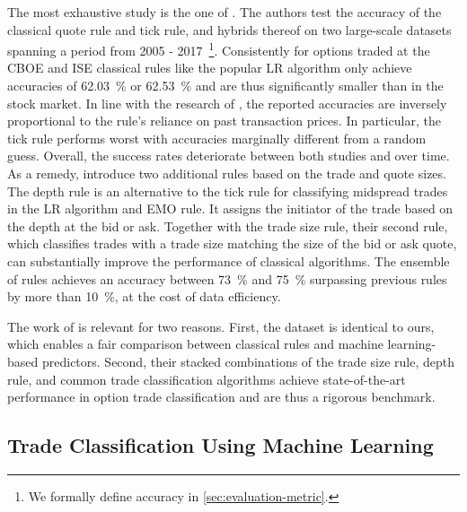 The most exhaustive study is the one of \textcite[1--39]{grauerOptionTradeClassification2022}. The authors test the accuracy of the classical quote rule and tick rule, and hybrids thereof on two large-scale datasets spanning a period from 2005 - 2017~\footnote{We formally define accuracy in \cref{sec:evaluation-metric}.}. Consistently for options traded at the \gls{CBOE} and \gls{ISE} classical rules like the popular \gls{LR}  algorithm only achieve accuracies of \SI{62.03}{\percent} or \SI{62.53}{\percent} and are thus significantly smaller than in the stock market. In line with the research of \textcite[886]{savickasInferringDirectionOption2003}, the reported accuracies are inversely proportional to the rule's reliance on past transaction prices. In particular, the tick rule performs worst with accuracies marginally different from a random guess. Overall, the success rates deteriorate between both studies and over time. As a remedy, \textcite[14--17]{grauerOptionTradeClassification2022} introduce two additional rules based on the trade and quote sizes. The depth rule is an alternative to the tick rule for classifying midspread trades in the \gls{LR}  algorithm and \gls{EMO} rule. It assigns the initiator of the trade based on the depth at the bid or ask. Together with the trade size rule, their second rule, which classifies trades with a trade size matching the size of the bid or ask quote, can substantially improve the performance of classical algorithms. The ensemble of rules achieves an accuracy between \SI{73}{\percent} and \SI{75}{\percent} surpassing previous rules by more than \SI{10}{\percent}, at the cost of data efficiency.

The work of \textcite[1--39]{grauerOptionTradeClassification2022} is relevant for two reasons. First, the dataset is identical to ours, which enables a fair comparison between classical rules and machine learning-based predictors. Second, their stacked combinations of the trade size rule, depth rule, and common trade classification algorithms achieve state-of-the-art performance in option trade classification and are thus a rigorous benchmark.

\subsection{Trade Classification Using Machine Learning}
\label{sec:trade-classification-using-machine-learning}

